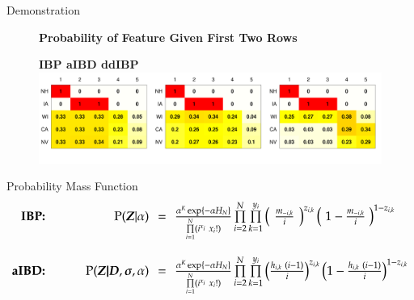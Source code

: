 \documentclass[serif,mathserif,final]{beamer}
\def\prodl#1#2#3{\prod\limits_{#1=#2}^{#3}}
\begin{document}
\begin{frame}{}
\begin{columns}[t]
\begin{column}{0.4\linewidth}
\begin{block}{Demonstration}
\begin{figure}[htb]
          \centering
          \textbf{Probability of Feature Given First Two Rows}\\ \vspace{.5em}
          \raggedright{\small\textsf{\textbf{\hspace{8.5em}IBP \hspace{15.5em} aIBD \hspace{15em} ddIBP}}}\\
          \includegraphics[width=.99\columnwidth]{expectArrest}\\
        \end{figure}
        \vspace{-1em}
      \end{block}

      \begin{block}{Probability Mass Function}
        \[\Large
        \begin{array}{rrcl}
          \text{\textbf{IBP:\hspace{2.5em}}}
          &\text{P}(\bm Z|\alpha) & = & \frac{\alpha^{K}\exp\{-\alpha H_N\}}
                                     {\prodl{i}{1}{N}(i^{x_i}~x_i!)} 
                                \prodl{i}{2}{N}\prodl{k}{1}{y_{i}}
                                \left( \hspace{.39em}  \frac{m_{-i,k}}{i} \hspace{.39em}\right)^{z_{i,k}}
                                \left( \hspace{.30em}1-\frac{m_{-i,k}}{i} \hspace{.30em}\right)^{1-z_{i,k}}\\
          &&&\\
          \text{\textbf{aIBD:\hspace{2.5em}}}
          &\text{P}(\bm{Z|D},\bm\sigma,\alpha) & = & 
                                \frac{\alpha^K \exp\{-\alpha H_N\}} 
                                     {\prodl{i}{1}{N}(i^{x_i}~x_i!)} 
                                \prodl{i}{2}{N}\prodl{k}{1}{y_i} 
                                \left( \frac{h_{i,k}   ~ (i-1)}{i} \right)^{z_{i,k}}
                                \left( 1-\frac{h_{i,k} ~ (i-1)}{i} \right)^{1-z_{i,k}}\\


\end{array}\]
\end{block}
\end{column}
\end{columns}
\end{frame}
\end{document}
